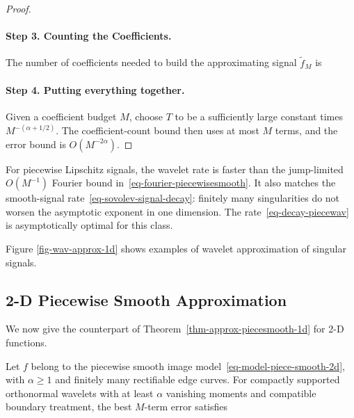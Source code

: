 \begin{proof}
\paragraph{Step 3. Counting the Coefficients.}
The number of coefficients needed to build the approximating signal $\tilde f_M$ is
\paragraph{Step 4. Putting everything together.}
Given a coefficient budget $M$, choose $T$ to be a sufficiently large constant times $M^{-(\alpha+1/2)}$. The coefficient-count bound then uses at most $M$ terms, and the error bound is $O(M^{-2\alpha})$.
\end{proof}

For piecewise Lipschitz signals, the wavelet rate is faster than the jump-limited $O(M^{-1})$ Fourier bound in~\eqref{eq-fourier-piecewisesmooth}. It also matches the smooth-signal rate~\eqref{eq-sovolev-signal-decay}: finitely many singularities do not worsen the asymptotic exponent in one dimension. The rate~\eqref{eq-decay-piecewav} is asymptotically optimal for this class.


Figure \ref{fig-wav-approx-1d} shows examples of wavelet approximation of singular signals. 


\subsection{2-D Piecewise Smooth Approximation}

We now give the counterpart of Theorem~\ref{thm-approx-piecesmooth-1d} for 2-D functions.

\begin{thm}\label{thm-approx-piecesmooth-2d}
Let $f$ belong to the piecewise smooth image model~\eqref{eq-model-piece-smooth-2d}, with $\alpha\geq1$ and finitely many rectifiable edge curves. For compactly supported orthonormal wavelets with at least $\alpha$ vanishing moments and compatible boundary treatment, the best $M$-term error satisfies
\end{thm}

